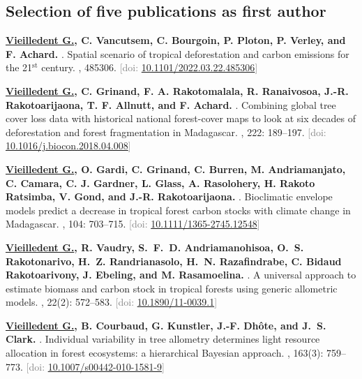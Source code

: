 \documentclass[10pt,a4paper,sans]{moderncv}
\newcounter{enumiv_gv}
\newcommand\doi[1]{[doi: \href{https://doi.org/#1}{#1}]}
\begin{document}
\vspace{0.3cm}
\subsection{Selection of five publications as first author}

\begin{thebibliography}{5}

\setcounter{enumiv}{4}
\textbf{\underline{Vieilledent G.}, C. Vancutsem, C. Bourgoin, P. Ploton, P. Verley, and F. Achard.} 
.
\newblock Spatial scenario of tropical deforestation and carbon emissions for the 21$^{\text{st}}$ century.
, 485306.
\newblock \textcolor{gray}{\doi{10.1101/2022.03.22.485306}}

\setcounter{enumiv}{3}
\textbf{\underline{Vieilledent G.}, C. Grinand, F. A. Rakotomalala, R. Ranaivosoa, J.-R. Rakotoarijaona, T. F. Allnutt, and F. Achard.} 
.
\newblock Combining global tree cover loss data with historical national forest-cover maps to look at six decades of deforestation and forest fragmentation in Madagascar.
, 222: 189--197.
\newblock \textcolor{gray}{\doi{10.1016/j.biocon.2018.04.008}}

\setcounter{enumiv}{2}
\textbf{\underline{Vieilledent G.}, O. Gardi, C. Grinand, C. Burren, M. Andriamanjato, C. Camara, C. J. Gardner, L. Glass, A. Rasolohery, H. Rakoto Ratsimba, V. Gond, and J.-R. Rakotoarijaona.} 
.
\newblock Bioclimatic envelope models predict a decrease in tropical forest carbon stocks with climate change in Madagascar.
, 104: 703--715.
\newblock \textcolor{gray}{\doi{10.1111/1365-2745.12548}}

\setcounter{enumiv}{1}
\textbf{\underline{Vieilledent G.}, R. Vaudry, S.~F.~D. Andriamanohisoa, O.~S. Rakotonarivo, H.~Z.
  Randrianasolo, H.~N. Razafindrabe, C. Bidaud Rakotoarivony, J. Ebeling, and M. Rasamoelina.}
.
\newblock A universal approach to estimate biomass and carbon stock in tropical
  forests using generic allometric models.
, 22(2): 572--583.
\newblock \textcolor{gray}{\doi{10.1890/11-0039.1}}

\setcounter{enumiv}{0}
\textbf{\underline{Vieilledent G.}, B. Courbaud, G. Kunstler, J.-F. Dhôte, and J.~S. Clark.}
.
\newblock Individual variability in tree allometry determines light resource
  allocation in forest ecosystems: a hierarchical Bayesian approach.
, 163(3): 759--773.
\newblock \textcolor{gray}{\doi{10.1007/s00442-010-1581-9}}

\end{thebibliography}
\end{document}
